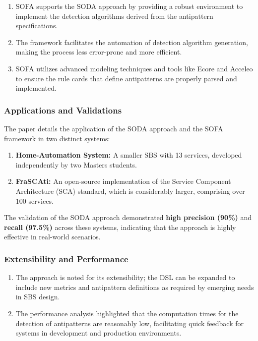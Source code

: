 \documentclass[12pt, times]{article}
\begin{document}
\begin{enumerate}
	\item SOFA supports the SODA approach by providing a robust environment to implement the detection algorithms derived from the antipattern specifications.
	\item The framework facilitates the automation of detection algorithm generation, making the process less error-prone and more efficient.
	\item SOFA utilizes advanced modeling techniques and tools like Ecore and Acceleo to ensure the rule cards that define antipatterns are properly parsed and implemented.
\end{enumerate}

\subsubsection*{Applications and Validations}

The paper details the application of the SODA approach and the SOFA framework in two distinct systems:

\begin{enumerate}
	\item \textbf{Home-Automation System:} A smaller SBS with 13 services, developed independently by two Masters students.
	\item \textbf{FraSCAti:} An open-source implementation of the Service Component Architecture (SCA) standard, which is considerably larger, comprising over 100 services.
\end{enumerate}

The validation of the SODA approach demonstrated \textbf{high precision (90\%)} and \textbf{recall (97.5\%)} across these systems, indicating that the approach is highly effective in real-world scenarios.

\subsubsection*{Extensibility and Performance}

\begin{enumerate}
	\item The approach is noted for its extensibility; the DSL can be expanded to include new metrics and antipattern definitions as required by emerging needs in SBS design.
	\item The performance analysis highlighted that the computation times for the detection of antipatterns are reasonably low, facilitating quick feedback for systems in development and production environments.
\end{enumerate}
\end{document}
